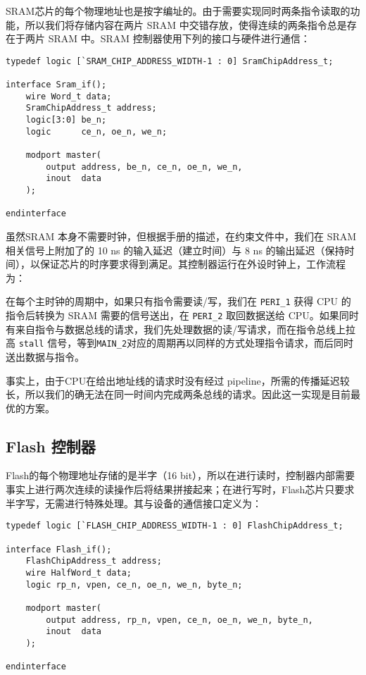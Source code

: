 SRAM芯片的每个物理地址也是按字编址的。由于需要实现同时两条指令读取的功能，所以我们将存储内容在两片 SRAM 中交错存放，使得连续的两条指令总是存在于两片 SRAM 中。SRAM 控制器使用下列的接口与硬件进行通信：

\begin{verbatim}
typedef logic [`SRAM_CHIP_ADDRESS_WIDTH-1 : 0] SramChipAddress_t;

interface Sram_if();
    wire Word_t data;
    SramChipAddress_t address;
    logic[3:0] be_n;
    logic      ce_n, oe_n, we_n;

    modport master(
        output address, be_n, ce_n, oe_n, we_n,
        inout  data
    );

endinterface
\end{verbatim}

虽然SRAM 本身不需要时钟，但根据手册的描述，在约束文件中，我们在 SRAM 相关信号上附加了的 10 ns 的输入延迟（建立时间）与 8 ns 的输出延迟（保持时间），以保证芯片的时序要求得到满足。其控制器运行在外设时钟上，工作流程为：

在每个主时钟的周期中，如果只有指令需要读/写，我们在 \texttt{PERI\_1} 获得 CPU 的指令后转换为 SRAM 需要的信号送出，在 \texttt{PERI\_2} 取回数据送给 CPU。如果同时有来自指令与数据总线的请求，我们先处理数据的读/写请求，而在指令总线上拉高 \texttt{stall} 信号，等到\texttt{MAIN\_2}对应的周期再以同样的方式处理指令请求，而后同时送出数据与指令。

事实上，由于CPU在给出地址线的请求时没有经过 pipeline，所需的传播延迟较长，所以我们的确无法在同一时间内完成两条总线的请求。因此这一实现是目前最优的方案。

\subsection{Flash 控制器}

Flash的每个物理地址存储的是半字（16 bit），所以在进行读时，控制器内部需要事实上进行两次连续的读操作后将结果拼接起来；在进行写时，Flash芯片只要求半字写，无需进行特殊处理。其与设备的通信接口定义为：

\begin{verbatim}
typedef logic [`FLASH_CHIP_ADDRESS_WIDTH-1 : 0] FlashChipAddress_t;

interface Flash_if();
    FlashChipAddress_t address;
    wire HalfWord_t data;
    logic rp_n, vpen, ce_n, oe_n, we_n, byte_n;

    modport master(
        output address, rp_n, vpen, ce_n, oe_n, we_n, byte_n,
        inout  data
    );

endinterface
\end{verbatim}

